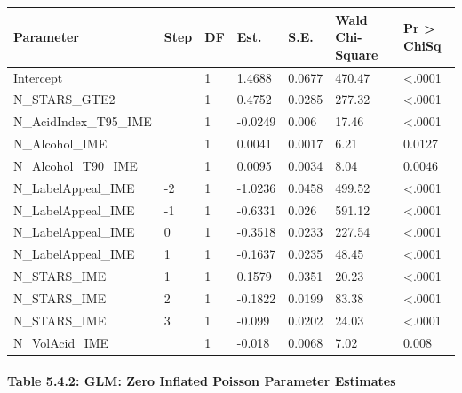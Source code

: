 \documentclass[]{article}
\let\oldparagraph\paragraph
\renewcommand{\paragraph}[1]{\oldparagraph{#1}\mbox{}}
\begin{document}
\begin{longtable}[]{@{}lllllll@{}}
\toprule
Parameter & Step & DF & Est. & S.E. & Wald Chi-Square & Pr
\textgreater{} ChiSq\tabularnewline
\midrule
\endhead
Intercept & & 1 & 1.4688 & 0.0677 & 470.47 &
\textless{}.0001\tabularnewline
N\_STARS\_GTE2 & & 1 & 0.4752 & 0.0285 & 277.32 &
\textless{}.0001\tabularnewline
N\_AcidIndex\_T95\_IME & & 1 & -0.0249 & 0.006 & 17.46 &
\textless{}.0001\tabularnewline
N\_Alcohol\_IME & & 1 & 0.0041 & 0.0017 & 6.21 & 0.0127\tabularnewline
N\_Alcohol\_T90\_IME & & 1 & 0.0095 & 0.0034 & 8.04 &
0.0046\tabularnewline
N\_LabelAppeal\_IME & -2 & 1 & -1.0236 & 0.0458 & 499.52 &
\textless{}.0001\tabularnewline
N\_LabelAppeal\_IME & -1 & 1 & -0.6331 & 0.026 & 591.12 &
\textless{}.0001\tabularnewline
N\_LabelAppeal\_IME & 0 & 1 & -0.3518 & 0.0233 & 227.54 &
\textless{}.0001\tabularnewline
N\_LabelAppeal\_IME & 1 & 1 & -0.1637 & 0.0235 & 48.45 &
\textless{}.0001\tabularnewline
N\_STARS\_IME & 1 & 1 & 0.1579 & 0.0351 & 20.23 &
\textless{}.0001\tabularnewline
N\_STARS\_IME & 2 & 1 & -0.1822 & 0.0199 & 83.38 &
\textless{}.0001\tabularnewline
N\_STARS\_IME & 3 & 1 & -0.099 & 0.0202 & 24.03 &
\textless{}.0001\tabularnewline
N\_VolAcid\_IME & & 1 & -0.018 & 0.0068 & 7.02 & 0.008\tabularnewline
\bottomrule
\end{longtable}

\paragraph{Table 5.4.2: GLM: Zero Inflated Poisson Parameter
Estimates}\label{table-5.4.2-glm-zero-inflated-poisson-parameter-estimates}
\end{document}
